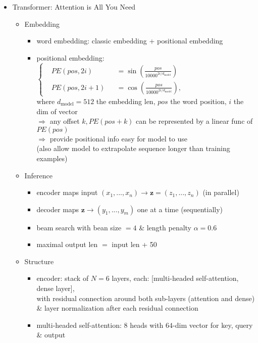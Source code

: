 \begin{itemize}
\item Transformer: Attention is All You Need
	\begin{itemize}
	\item Embedding
		\begin{itemize}
		\item word embedding: classic embedding + positional embedding
		\item positional embedding: \\
		$\left\{\begin{alignedat}{2} &PE(pos, 2i) &&= \sin\left( \frac{pos}{10000^{2i/d_\text{model}}} \right)  \\ &PE(pos, 2i+1) &&= \cos\left( \frac{pos}{10000^{2i/d_\text{model}}} \right), \end{alignedat}\right.$\\
		where $d_\text{model}=512$ the embedding len, $pos$ the word position, $i$ the dim of vector \\
		$\Rightarrow$ any offset $k, PE(pos+k)$ can be represented by a linear func of $PE(pos)$ \\
		$\Rightarrow$ provide positional info easy for model to use \\
		(also allow model to extrapolate sequence longer than training examples)
		\end{itemize}
	\item Inference
		\begin{itemize}
		\item encoder maps input $(x_1,...,x_n) \rightarrow \mathbf z=(z_1,...,z_n)$ (in parallel)
		\item decoder maps $\mathbf z \rightarrow (y_1,...,y_m)$ one at a time (sequentially)
		\item beam search with bean size $=4$ \& length penalty $\alpha=0.6$
		\item maximal output len $=$ input len + 50
		\end{itemize}
	\item Structure
		\begin{itemize}
		\item encoder: stack of $N=6$ layers, each: [multi-headed self-attention, dense layer], \\
		with residual connection around both sub-layers (attention and dense) \\
		\& layer normalization after each residual connection
		\item multi-headed self-attention: $8$ heads with $64$-dim vector for key, query \& output \\

\end{itemize}
\end{itemize}
\end{itemize}
